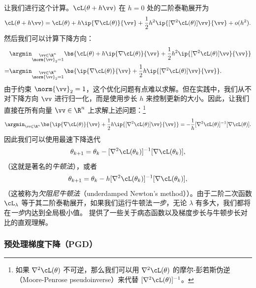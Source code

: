 \documentclass[../../book-main_zh.tex]{subfiles}
\begin{document}
让我们进行这个计算。\(\cL(\theta + h\vv)\) 在 \(h = 0\) 处的二阶泰勒展开为
\begin{equation}
    \cL(\theta + h\vv) = \cL(\theta) + h\ip{\nabla \cL(\theta)}{\vv}
    + \frac{1}{2}h^{2}\ip{[\nabla^{2}\cL(\theta)]\vv}{\vv} + o(h^{2}).
\end{equation}
然后我们可以计算下降方向：
\begin{align}
    &\argmin_{\substack{\vv \in \R^{n} \\ \norm{\vv}_{2} =
    1}}\bs{\cL(\theta) + h\ip{\nabla \cL(\theta)}{\vv} +
    \frac{1}{2}h^{2}\ip{[\nabla^{2}\cL(\theta)]\vv}{\vv}} \\
    =& \argmin_{\substack{\vv \in \R^{n} \\ \norm{\vv}_{2} =
    1}}\bs{\ip{\nabla \cL(\theta)}{\vv} +
    \frac{1}{2}h\ip{[\nabla^{2}\cL(\theta)]\vv}{\vv}}.
\end{align}
由于约束 \(\norm{\vv}_{2} = 1\)，这个优化问题有点难以求解。但在实践中，我们从不对下降方向 \(\vv\) 进行归一化，而是使用步长 \(h\) 来控制更新的大小。因此，让我们直接在所有向量 \(\vv \in \R^{n}\) 上求解上述问题：\footnote{如果 \(\nabla^{2}\cL(\theta)\) 不可逆，那么我们可以用 \(\nabla^{2}\cL(\theta)\) 的摩尔-彭若斯伪逆（Moore-Penrose pseudoinverse）来代替 \([\nabla^{2}\cL(\theta)]^{-1}\)。}
\begin{equation}
    \argmin_{\vv \in \R^{n}}\bs{\ip{\nabla \cL(\theta)}{\vv} +
    \frac{1}{2}h\ip{[\nabla^{2}\cL(\theta)]\vv}{\vv}} =
    -\frac{1}{h}[\nabla^{2}\cL(\theta)]^{-1}[\nabla \cL(\theta)].
\end{equation}
因此我们可以使用最速下降迭代
\begin{equation}
    \theta_{k + 1} = \theta_{k} -
    [\nabla^{2}\cL(\theta_{k})]^{-1}[\nabla \cL(\theta_{k})],
\end{equation}
（这就是著名的\textit{牛顿法}），或者
\begin{equation}
    \theta_{k + 1} = \theta_{k} -
    h[\nabla^{2}\cL(\theta_{k})]^{-1}[\nabla \cL(\theta_{k})],
\end{equation}
（这被称为\textit{欠阻尼牛顿法}（underdamped Newton's method））。由于二阶二次函数 \(\cL_{\lambda}\) 等于其二阶泰勒展开，如果我们运行牛顿法\textit{一步}，无论 \(\lambda\) 有多大，我们都将在\textit{一步}内达到全局极小值。 提供了一些关于病态函数以及梯度步长与牛顿步长对比的直观理解。

\subsubsection{预处理梯度下降（PGD）}
\end{document}
